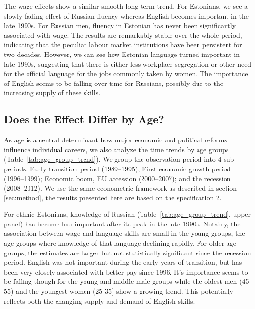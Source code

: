 \documentclass[12pt, a4paper]{article}
\begin{document}
The wage effects show a similar smooth long-term trend.  For Estonians, we
see a slowly fading effect of Russian fluency whereas
English becomes important in the late 1990s.  For Russian men, fluency in Estonian
has never been significantly associated with wage.
The results are remarkably stable over the whole period, indicating
that the peculiar labour market institutions have been persistent for
two decades.  However, we can see how Estonian language turned
important in late 1990s, suggesting that there is either less
workplace segregation or other need for the official language for
the jobs commonly taken by women.  The
importance of English seems to be falling over time for Russians, possibly
due to the increasing supply of these skills. 


\subsection{Does the Effect Differ by Age?}
\label{sec:age_groups}

As age is a central determinant how major economic and political
reforms influence individual careers, 
we also analyze the time trends by age groups
(Table~\ref{tab:age_group_trend}).
We group the observation period into 4 sub-periods: Early transition period
(1989--1995); First economic growth period (1996--1999);
Economic boom, EU accession (2000--2007); and the recession
(2008--2012).
We use the same econometric framework as described in section
\ref{sec:method}, the results presented here are based on the specification 2.

For ethnic Estonians, knowledge of Russian
(Table~\ref{tab:age_group_trend}, upper panel) has become less
important after its peak in the late 1990s. Notably, the
association between wage and language skills are small in the
young groups, the age groups where knowledge of that language
declining rapidly.
For older age groups, the estimates are larger but not statistically
significant since the recession period.  English was not important
during the early years of transition, but has been very closely
associated with better pay since 1996.  It's importance seems to be
falling though for the young and middle male groups while the oldest men
(45-55) and the youngest women (25-35) show a growing trend.
This potentially reflects both the changing supply and demand of
English skills.
\end{document}
